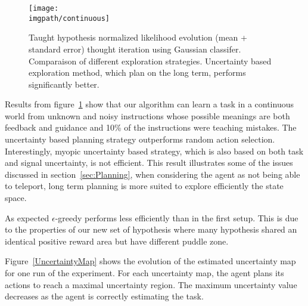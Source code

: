 \begin{figure}[!htbp]
  \centering
  \texttt{[image: \\imgpath/continuous]}
  \caption{Taught hypothesis normalized likelihood evolution (mean + standard error) thought iteration using Gaussian classifer. Comparaison of different exploration strategies. Uncertainty based exploration method, which plan on the long term, performs significantly better.}
  \label{Rmax}
\end{figure}

Results from figure~\ref{Rmax} show that our algorithm can learn a task in a continuous world from unknown and noisy instructions whose possible meanings are both feedback and guidance and 10\% of the instructions were teaching mistakes. The uncertainty based planning strategy outperforms random action selection. Interestingly, myopic uncertainty based strategy, which is also based on both task and signal uncertainty, is not efficient. This result illustrates some of the issues discussed in section~\ref{sec:Planning}, when considering the agent as not being able to teleport, long term planning is more suited to explore efficiently the state space. 

As expected $\epsilon$-greedy performs less efficiently than in the first setup. This is due to the properties of our new set of hypothesis where many hypothesis shared an identical positive reward area but have different puddle zone.

Figure~\ref{UncertaintyMap} shows the evolution of the estimated uncertainty map for one run of the experiment. For each uncertainty map, the agent plans its actions to reach a maximal uncertainty region. The maximum uncertainty value decreases as the agent is correctly estimating the task.

